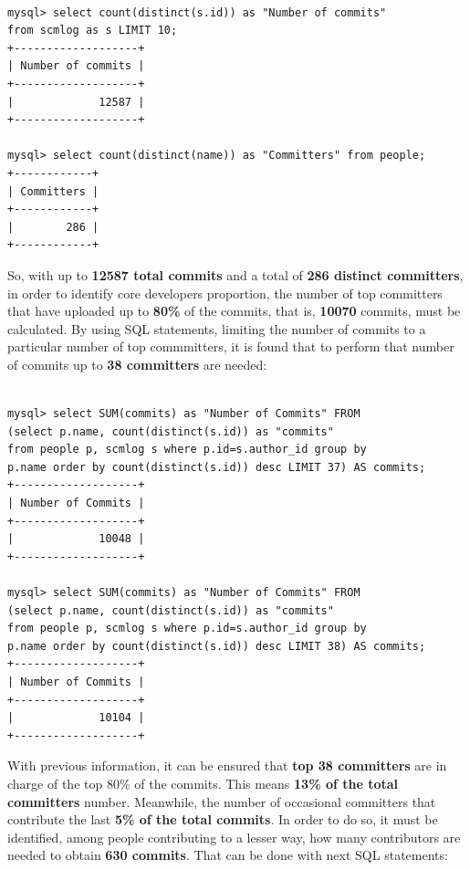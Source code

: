 \documentclass[a4paper, 12pt]{book}
\begin{document}
\begin{verbatim}

mysql> select count(distinct(s.id)) as "Number of commits"
from scmlog as s LIMIT 10;
+-------------------+
| Number of commits |
+-------------------+
|             12587 |
+-------------------+

mysql> select count(distinct(name)) as "Committers" from people;
+------------+
| Committers |
+------------+
|        286 |
+------------+

\end{verbatim}

So, with up to \textbf{12587 total commits} and a total of \textbf{286 distinct committers}, in order to identify core developers proportion, the number of top committers that have uploaded up to \textbf{80\%} of the commits, that is, \textbf{10070} commits, must be calculated. By using SQL statements, limiting the number of commits to a particular number of top commmitters, it is found that to perform that number of commits up to \textbf{38 committers} are needed:

\begin{verbatim}

mysql> select SUM(commits) as "Number of Commits" FROM
(select p.name, count(distinct(s.id)) as "commits"
from people p, scmlog s where p.id=s.author_id group by
p.name order by count(distinct(s.id)) desc LIMIT 37) AS commits;
+-------------------+
| Number of Commits |
+-------------------+
|             10048 |
+-------------------+

mysql> select SUM(commits) as "Number of Commits" FROM
(select p.name, count(distinct(s.id)) as "commits"
from people p, scmlog s where p.id=s.author_id group by
p.name order by count(distinct(s.id)) desc LIMIT 38) AS commits;
+-------------------+
| Number of Commits |
+-------------------+
|             10104 |
+-------------------+

\end{verbatim}
With previous information, it can be ensured that \textbf{top 38 committers} are in charge of the top 80\% of the commits. This means \textbf{13\% of the total committers} number. Meanwhile, the number of occasional committers that contribute the last \textbf{5\% of the total commits}. In order to do so, it must be identified, among people contributing to a lesser way, how many contributors are needed to obtain \textbf{630 commits}. That can be done with next SQL statements:
\end{document}
